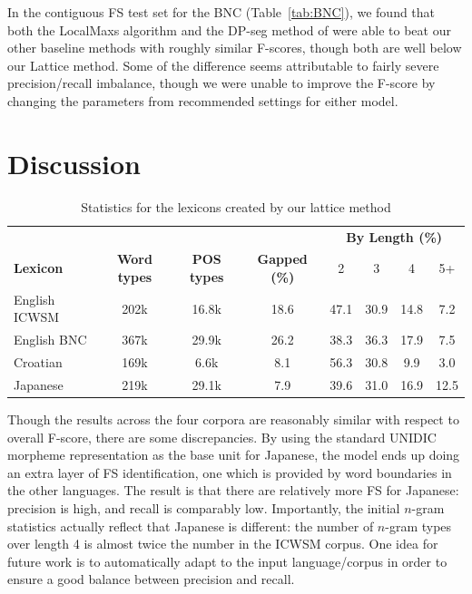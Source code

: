 \documentclass[11pt,letterpaper]{article}
\newcommand{\z}{\phantom{0}}
\newcommand{\tabref}[2][]{Table#1~\ref{#2}\xspace}
\begin{document}
In the contiguous FS test set for the BNC (\tabref{tab:BNC}), we found that both the LocalMaxs algorithm and the DP-seg method of  were able to beat our other baseline methods with roughly similar F-scores, though both are well below our Lattice method. Some of the difference seems attributable to fairly severe precision/recall imbalance, though we were unable to improve the F-score by changing the parameters from recommended settings for either model.


\section{Discussion} \label{sec:discussion}


\begin{table}[!bt]
 
 \begin{center}
 \begin{tabular}{lccccccc}
\toprule
& & & & \multicolumn{4}{c}{\bf{By Length (\%) }} \\
       \cmidrule(lr){5-8}	
\bf{Lexicon} & \bf{Word types} & \bf{POS types} & \bf{Gapped} (\%) & 2 & 3 & 4 & 5+ \\ 
\midrule
English ICWSM & 202k & 16.8k & 18.6 & 47.1 & 30.9 & 14.8 & \z7.2  \\
English BNC & 367k &  29.9k& 26.2& 38.3 & 36.3 & 17.9 & \z7.5 \\
Croatian & 169k & \z6.6k & \z8.1& 56.3& 30.8 & 9.9 & \z3.0 \\
Japanese & 219k &  29.1k &\z7.9& 39.6 & 31.0& 16.9 & 12.5 \\
\bottomrule
\end{tabular}
  \caption{Statistics for the lexicons created by our lattice method}
	 \label{tab:lexstats}

 \end{center}


 \end{table}


Though the results across the four corpora are reasonably similar with respect to overall F-score, there are some discrepancies. By using the standard UNIDIC morpheme representation as the base unit for Japanese, the model ends up doing an extra layer of FS identification, one which is provided by word boundaries in the other languages. The result is that there are relatively more FS for Japanese: precision is high, and recall is comparably low.  Importantly, the initial $n$-gram statistics actually reflect that Japanese is different: the number of $n$-gram types over length 4 is almost twice the number in the ICWSM corpus. One idea for future work is to automatically adapt to the input language/corpus in order to ensure a good balance between precision and recall.
\end{document}
